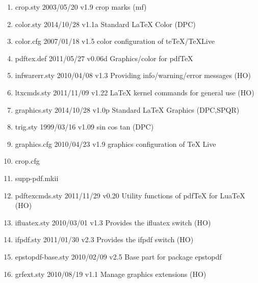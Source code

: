 \begin{enumerate}
\item crop.sty 2003/05/20 v1.9 crop marks (mf)
\item color.sty 2014/10/28 v1.1a Standard LaTeX Color (DPC)
\item color.cfg 2007/01/18 v1.5 color configuration of teTeX/TeXLive
\item pdftex.def 2011/05/27 v0.06d Graphics/color for pdfTeX
\item infwarerr.sty 2010/04/08 v1.3 Providing info/warning/error messages (HO)
\item ltxcmds.sty 2011/11/09 v1.22 LaTeX kernel commands for general use (HO)
\item graphics.sty 2014/10/28 v1.0p Standard LaTeX Graphics (DPC,SPQR)
\item trig.sty 1999/03/16 v1.09 sin cos tan (DPC)
\item graphics.cfg 2010/04/23 v1.9 graphics configuration of TeX Live
\item crop.cfg
\item supp-pdf.mkii
\item pdftexcmds.sty 2011/11/29 v0.20 Utility functions of pdfTeX for LuaTeX (HO)
\item ifluatex.sty 2010/03/01 v1.3 Provides the ifluatex switch (HO)
\item ifpdf.sty 2011/01/30 v2.3 Provides the ifpdf switch (HO)
\item epstopdf-base.sty 2010/02/09 v2.5 Base part for package epstopdf
\item grfext.sty 2010/08/19 v1.1 Manage graphics extensions (HO)

\end{enumerate}
